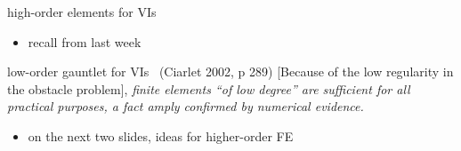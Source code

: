 \documentclass[aspectratio=169,10pt]{beamer}
\begin{document}
\begin{frame}{high-order elements for VIs}

\begin{itemize}
\item recall from last week
\end{itemize}

{\small
\begin{block}{low-order gauntlet for VIs \, (Ciarlet 2002, p 289)}
[Because of the low regularity in the obstacle problem], \emph{finite elements ``of low degree'' are sufficient for all practical purposes, a fact amply confirmed by numerical evidence.}
\end{block}
}

\bigskip
\begin{itemize}
\item on the next two slides, ideas for higher-order FE
\end{itemize}
\end{frame}
\end{document}
